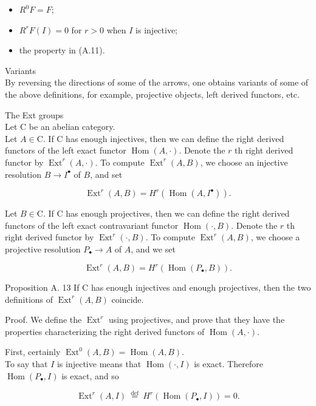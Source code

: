 \documentclass[10pt]{article}
\begin{document}
\begin{itemize}
  \item[(a)] $R^{0} F=F$;
  \item[(b)] $R^{r} F(I)=0$ for $r>0$ when $I$ is injective;
  \item[(c)] the property in (A.11).
\end{itemize}

Variants\\
By reversing the directions of some of the arrows, one obtains variants of some of the above definitions, for example, projective objects, left derived functors, etc.

The Ext groups\\
Let C be an abelian category.\\
Let $A \in \mathrm{C}$. If C has enough injectives, then we can define the right derived functors of the left exact functor $\operatorname{Hom}(A, \cdot)$. Denote the $r$ th right derived functor by $\operatorname{Ext}^{r}(A, \cdot)$. To compute $\operatorname{Ext}^{r}(A, B)$, we choose an injective resolution $B \rightarrow I^{\bullet}$ of $B$, and set

$$
\operatorname{Ext}^{r}(A, B)=H^{r}\left(\operatorname{Hom}\left(A, I^{\bullet}\right)\right) .
$$

Let $B \in \mathrm{C}$. If C has enough projectives, then we can define the right derived functors of the left exact contravariant functor $\operatorname{Hom}(\cdot, B)$. Denote the $r$ th right derived functor by $\operatorname{Ext}^{r}(\cdot, B)$. To compute $\operatorname{Ext}^{r}(A, B)$, we choose a projective resolution $P_{\bullet} \rightarrow A$ of $A$, and we set

$$
\operatorname{Ext}^{r}(A, B)=H^{r}\left(\operatorname{Hom}\left(P_{\bullet}, B\right)\right) .
$$

Proposition A. 13 If C has enough injectives and enough projectives, then the two definitions of $\operatorname{Ext}^{r}(A, B)$ coincide.

Proof. We define the $\operatorname{Ext}^{r}$ using projectives, and prove that they have the properties characterizing the right derived functors of $\operatorname{Hom}(A, \cdot)$.

First, certainly $\operatorname{Ext}^{0}(A, B)=\operatorname{Hom}(A, B)$.\\
To say that $I$ is injective means that $\operatorname{Hom}(\cdot, I)$ is exact. Therefore $\operatorname{Hom}\left(P_{\bullet}, I\right)$ is exact, and so

$$
\operatorname{Ext}^{r}(A, I) \stackrel{\text { def }}{=} H^{r}\left(\operatorname{Hom}\left(P_{\bullet}, I\right)\right)=0 .
$$
\end{document}
